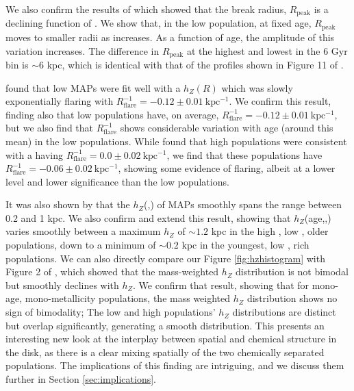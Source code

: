  We also confirm the results of \citet{2016ApJ...823...30B} which showed that the break radius, $R_{\mathrm{peak}}$ is a declining function of \feh{}. We show that, in the low \afe{} population, at fixed age, $R_{\mathrm{peak}}$ moves to smaller radii as \feh{} increases. As a function of age, the amplitude of this variation increases. The difference in $R_{\mathrm{peak}}$ at the highest and lowest \feh{} in the 6 Gyr bin is $\sim 6$ kpc, which is identical with that of the profiles shown in Figure 11 of \citet{2016ApJ...823...30B}.
 
\citet{2016ApJ...823...30B} found that low \afe{} MAPs were fit well with a $h_Z(R)$ which was slowly exponentially flaring with $R_{\mathrm{flare}}^{-1} = -0.12 \pm 0.01 \ \mathrm{kpc^{-1}}$. We confirm this result, finding also that low \afe{} populations have, on average, $R_{\mathrm{flare}}^{-1} = -0.12 \pm 0.01 \ \mathrm{kpc^{-1}}$, but we also find that $R_{\mathrm{flare}}^{-1}$ shows considerable variation with age (around this mean) in the low \afe{} populations. While \citet{2016ApJ...823...30B} found that high \afe{} populations were consistent with a having $R_{\mathrm{flare}}^{-1} = 0.0 \pm 0.02\ \mathrm{kpc^{-1}}$, we find that these populations have $R_{\mathrm{flare}}^{-1} = -0.06 \pm 0.02\ \mathrm{kpc^{-1}}$, showing some evidence of flaring, albeit at a lower level and lower significance than the low \afe{} populations.

It was also shown by \citet{2012ApJ...753..148B,2016ApJ...823...30B} that the $h_Z$(\afe{},\feh{}) of MAPs smoothly spans the range between 0.2 and 1 kpc. We also confirm and extend this result, showing that $h_Z$(age,\afe{},\feh{}) varies smoothly between a maximum $h_Z$ of $\sim 1.2$ kpc in the high \afe{}, low \feh{}, older populations, down to a minimum of $\sim 0.2$ kpc in the youngest, low \afe{}, \feh{} rich populations. We can also directly compare our Figure \ref{fig:hzhistogram} with Figure 2 of \citet{2012ApJ...751..131B}, which showed that the mass-weighted $h_Z$ distribution is not bimodal but smoothly declines with $h_Z$. We confirm that result, showing that for mono-age, mono-metallicity populations, the mass weighted $h_Z$ distribution shows no sign of bimodality; The low and high \afe{} populations' $h_Z$ distributions are distinct but overlap significantly, generating a smooth distribution. This presents an interesting new look at the interplay between spatial and chemical structure in the disk, as there is a clear mixing spatially of the two chemically separated populations. The implications of this finding are intriguing, and we discuss them further in Section \ref{sec:implications}.

